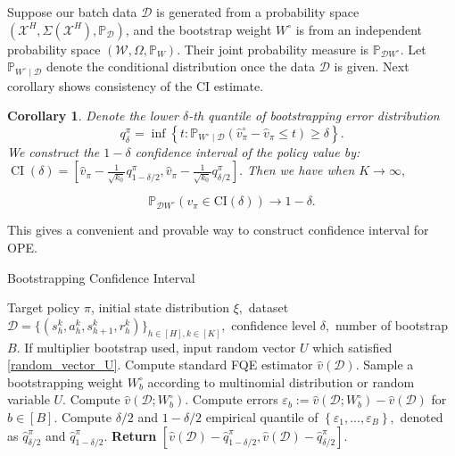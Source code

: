 \documentclass{article}
\numberwithin{equation}{section}
\theoremstyle{plain}
\newtheorem{corollary}[theorem]{Corollary}
\theoremstyle{definition}
\theoremstyle{remark}
\begin{document}
Suppose our batch data $\mathcal{D}$ is generated from a probability space $\left(\mathcal{X}^H, \Sigma\left(\mathcal{X}^H\right), \mathbb{P}_{\mathcal{D}}\right)$, and the bootstrap weight $W^{\circ}$ is from an independent probability space $\left(\mathcal{W}, \Omega, \mathbb{P}_{W}\right)$. Their joint probability measure is $\mathbb{P}_{\mathcal{D} W^{\circ}}$. Let $\mathbb{P}_{W^{\circ} \mid \mathcal{D}}$ denote the conditional distribution once the data $\mathcal{D}$ is given. Next corollary shows consistency of the CI estimate. 
\begin{corollary}\label{coro_CI}
    Denote the lower $\delta$-th quantile of bootstrapping error distribution $$q_{\delta}^{\pi}=\inf \left\{t: \mathbb{P}_{W^{\circ} \mid \mathcal{D}} \left(\widehat{v}_{\pi}^{\circ}-\widehat{v}_{\pi} \leq t\right) \geq \delta\right\} .$$ 
    We construct the $1-\delta$ confidence interval of the policy value by: $\operatorname{CI}(\delta)=\left[\widehat{v}_{\pi} - \frac{1}{\sqrt{k_0}} q_{1 - \delta / 2}^{\pi}, \widehat{v}_{\pi}- \frac{1}{\sqrt{k_0}} q_{\delta / 2}^{\pi}\right] .$ Then we have when $K \to \infty,$
    \begin{small}
    $$
    \mathbb{P}_{\mathcal{D} W^{\circ}}\left(v_{\pi} \in \mathrm{CI}(\delta)\right) \rightarrow 1-\delta.$$
    \end{small}
\end{corollary}
This gives a convenient and provable way to construct confidence interval for OPE. 

\begin{algorithm}[htb!]
\caption{Bootstrapping Confidence Interval}
\label{alg1}
	\begin{algorithmic}[1] 
		\Require Target policy $\pi$, initial state distribution $\xi,$ dataset $\mathcal{D}=\{(s^{k}_h,a^{k}_h,s^{k}_{h+1},r^{k}_h)\}_{h\in[H],k\in[K]},$ confidence level $\delta,$ number of bootstrap $B.$ If multiplier bootstrap used, input random vector $U$ which satisfied \eqref{random_vector_U}.
		\State Compute standard FQE estimator $\widehat{v}(\mathcal{D}).$
		\State Sample a bootstrapping weight $W_b^\circ$ according to multinomial distribution or random variable $U.$
		\State Compute $\widehat{v}\left(\mathcal{D};W_b^\circ\right).$
		\EndFor
		\State Compute errors $\varepsilon_b := \widehat{v}\left(\mathcal{D};W_b^\circ\right) - \widehat{v}(\mathcal{D})$ for $b \in [B].$
		\State Compute $\delta/2$ and $1 - \delta/2$ empirical quantile of $\left\{\varepsilon_1,...,\varepsilon_B\right\},$ denoted as $\widehat{q}^{\pi}_{\delta/2}$ and $\widehat{q}^{\pi}_{1 - \delta/2}.$
		\State \textbf{Return} $\left[\widehat{v}\left(\mathcal{D}\right) - \widehat{q}^{\pi}_{1 - \delta/2}, \widehat{v}\left(\mathcal{D}\right) - \widehat{q}^{\pi}_{\delta/2}\right].$
	\end{algorithmic}
\end{algorithm}
\end{document}
